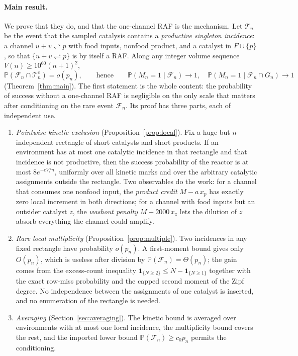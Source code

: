 \documentclass[11pt,letterpaper]{article}
\theoremstyle{plain}
\theoremstyle{definition}
\theoremstyle{remark}
\numberwithin{equation}{section}
\newcommand{\PP}{\mathbb P}
\newcommand{\cF}{\mathcal F}
\newcommand{\cT}{\mathcal T}
\newcommand{\ind}{\mathbf 1}
\begin{document}
\paragraph{Main result.}
We prove that they do, and that the one-channel RAF is the mechanism. Let $\cT_n$ be the event that the sampled catalysis contains a \emph{productive singleton incidence}: a channel $u+v\rightleftharpoons p$ with food inputs, nonfood product, and a catalyst in $F\cup\{p\}$, so that $\{u+v\rightleftharpoons p\}$ is by itself a RAF. Along any integer volume sequence $V(n)\ge10^{60}(n+1)^2$,
\begin{equation}\label{eq:intro-core}
 \PP(\cF_n\cap\cT_n^c)=o(p_n),
 \qquad\text{hence}\qquad
 \PP(M_n=1\mid\cF_n)\to1,\quad \PP(M_n=1\mid\cF_n\cap G_n)\to1
\end{equation}
(Theorem~\ref{thm:main}). The first statement is the whole content: the probability of success without a one-channel RAF is negligible on the only scale that matters after conditioning on the rare event $\cF_n$. Its proof has three parts, each of independent use.
\begin{enumerate}[label=(\arabic*)]
\item \emph{Pointwise kinetic exclusion} (Proposition~\ref{prop:local}). Fix a huge but $n$-independent rectangle of short catalysts and short products. If an environment has at most one catalytic incidence in that rectangle and that incidence is not productive, then the success probability of the reactor is at most $8e^{-cV/n}$, uniformly over all kinetic marks and over the arbitrary catalytic assignments outside the rectangle. Two observables do the work: for a channel that consumes one nonfood input, the \emph{product credit} $M-a\,x_p$ has exactly zero local increment in both directions; for a channel with food inputs but an outsider catalyst $z$, the \emph{washout penalty} $M+2000\,x_z$ lets the dilution of $z$ absorb everything the channel could amplify.
\item \emph{Rare local multiplicity} (Proposition~\ref{prop:multiple}). Two incidences in any fixed rectangle have probability $o(p_n)$. A first-moment bound gives only $O(p_n)$, which is useless after division by $\PP(\cF_n)=\Theta(p_n)$; the gain comes from the excess-count inequality $\ind_{\{N\ge2\}}\le N-\ind_{\{N\ge1\}}$ together with the exact row-miss probability and the capped second moment of the Zipf degree. No independence between the assignments of one catalyst is inserted, and no enumeration of the rectangle is needed.
\item \emph{Averaging} (Section~\ref{sec:averaging}). The kinetic bound is averaged over environments with at most one local incidence, the multiplicity bound covers the rest, and the imported lower bound $\PP(\cF_n)\ge c_0p_n$ permits the conditioning.
\end{enumerate}
\end{document}

